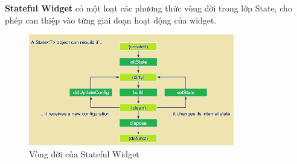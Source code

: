 \documentclass[../DoAn.tex]{subfiles}
\numberwithin{figure}{chapter}
\begin{document}
\textbf{Stateful Widget} có một loạt các phương thức vòng đời trong lớp State, cho phép can thiệp vào từng giai đoạn hoạt động của widget.
\begin{figure}[H]
    \centering
    \includegraphics[width=0.8\textwidth]{Hinhve/Chuong5/statefulwidgetimg.png}
    \caption{Vòng đời của Stateful Widget}
    \label{fig:statefulwidgetimg}
\end{figure}
\end{document}
